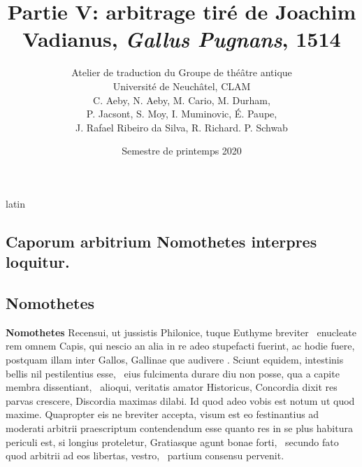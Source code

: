 \documentclass[12pt]{book}
\renewenvironment{latin}
    	{\begin{hyphenrules}{latin}}
    	{\end{hyphenrules}}
\begin{document}
        \title{Partie V: arbitrage tiré de Joachim Vadianus, \textit{Gallus Pugnans}, 1514}
        \author{Atelier de traduction du Groupe de théâtre antique\\
            Université de Neuchâtel, CLAM\\
            C. Aeby, N. Aeby, M. Cario, M. Durham,\\ 
            P. Jacsont, S. Moy, I. Muminovic, É. Paupe,\\
            J. Rafael Ribeiro da Silva, R. Richard. P. Schwab}
        \date{Semestre de printemps 2020}
        
        \maketitle
        \begin{pages}
        \begin{latin}
        \begin{Leftside}
        \beginnumbering 
            \pstart\section*{Caporum arbitrium Nomothetes interpres loquitur.}\pend\pstart\subsection*{Nomothetes}\pend\pstart\textbf{Nomothetes}\hspace{1cm} 
                    Recensui, ut jussistis Philonice, tuque Euthyme breviter ﻿\ampersand\ enucleate rem omnem Capis, 
                    qui nescio an alia in re  adeo stupefacti fuerint, 
                    ac hodie fuere, postquam illam inter Gallos, Gallinae que audivere . 
                    Sciunt equidem, intestinis bellis nil pestilentius esse, ﻿\ampersand\ eius  fulcimenta durare diu non posse, 
                    qua a capite membra dissentiant, ﻿\ampersand\ alioqui, veritatis amator Historicus, Concordia dixit res parvas crescere, Discordia maximas dilabi. 
                    Id quod adeo vobis est notum ut quod maxime. 
                    Quapropter eis ne breviter accepta, 
                    visum est eo festinantius ad moderati arbitrii praescriptum contendendum esse quanto res in se plus habitura periculi est, 
                    si longius proteletur, Gratiasque agunt bonae forti, ﻿\ampersand\ secundo fato quod arbitrii ad eos libertas, vestro, ﻿\ampersand\ partium consensu pervenit. 

\end{Leftside}
\end{latin}
\end{pages}
\end{document}
